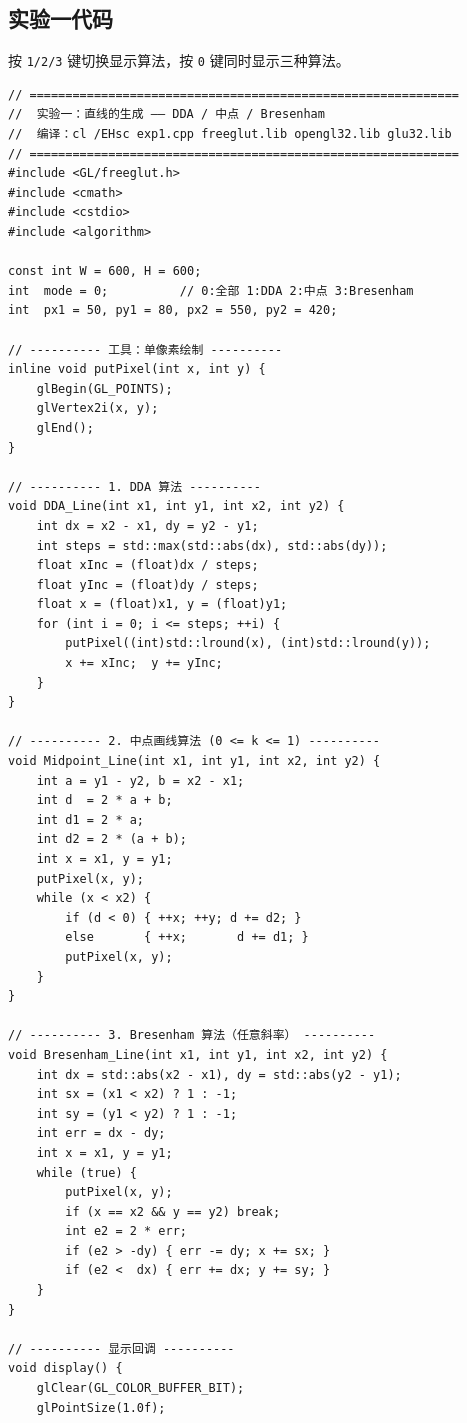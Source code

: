 \documentclass[a4paper,12pt]{ctexart}
\begin{document}
\subsection{实验一代码}

按 \texttt{1/2/3} 键切换显示算法，按 \texttt{0} 键同时显示三种算法。

\begin{lstlisting}[style=cppstyle,caption={直线生成算法对比 —— 完整源代码}]
// ============================================================
//  实验一：直线的生成 —— DDA / 中点 / Bresenham
//  编译：cl /EHsc exp1.cpp freeglut.lib opengl32.lib glu32.lib
// ============================================================
#include <GL/freeglut.h>
#include <cmath>
#include <cstdio>
#include <algorithm>

const int W = 600, H = 600;
int  mode = 0;          // 0:全部 1:DDA 2:中点 3:Bresenham
int  px1 = 50, py1 = 80, px2 = 550, py2 = 420;

// ---------- 工具：单像素绘制 ----------
inline void putPixel(int x, int y) {
    glBegin(GL_POINTS);
    glVertex2i(x, y);
    glEnd();
}

// ---------- 1. DDA 算法 ----------
void DDA_Line(int x1, int y1, int x2, int y2) {
    int dx = x2 - x1, dy = y2 - y1;
    int steps = std::max(std::abs(dx), std::abs(dy));
    float xInc = (float)dx / steps;
    float yInc = (float)dy / steps;
    float x = (float)x1, y = (float)y1;
    for (int i = 0; i <= steps; ++i) {
        putPixel((int)std::lround(x), (int)std::lround(y));
        x += xInc;  y += yInc;
    }
}

// ---------- 2. 中点画线算法 (0 <= k <= 1) ----------
void Midpoint_Line(int x1, int y1, int x2, int y2) {
    int a = y1 - y2, b = x2 - x1;
    int d  = 2 * a + b;
    int d1 = 2 * a;
    int d2 = 2 * (a + b);
    int x = x1, y = y1;
    putPixel(x, y);
    while (x < x2) {
        if (d < 0) { ++x; ++y; d += d2; }
        else       { ++x;       d += d1; }
        putPixel(x, y);
    }
}

// ---------- 3. Bresenham 算法（任意斜率） ----------
void Bresenham_Line(int x1, int y1, int x2, int y2) {
    int dx = std::abs(x2 - x1), dy = std::abs(y2 - y1);
    int sx = (x1 < x2) ? 1 : -1;
    int sy = (y1 < y2) ? 1 : -1;
    int err = dx - dy;
    int x = x1, y = y1;
    while (true) {
        putPixel(x, y);
        if (x == x2 && y == y2) break;
        int e2 = 2 * err;
        if (e2 > -dy) { err -= dy; x += sx; }
        if (e2 <  dx) { err += dx; y += sy; }
    }
}

// ---------- 显示回调 ----------
void display() {
    glClear(GL_COLOR_BUFFER_BIT);
    glPointSize(1.0f);


\end{lstlisting}
\end{document}
